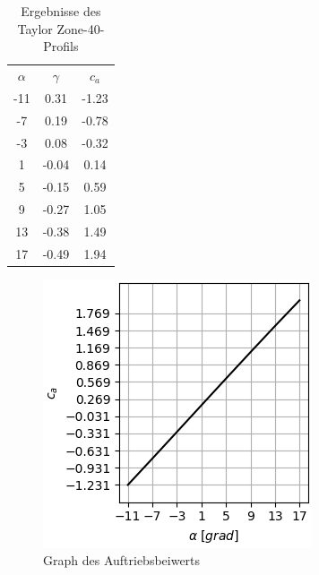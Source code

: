 \begin{minipage}{0.45\textwidth}
\begin{table}[H]
    \centering
    \begin{tabular}{c|cc}
    $\alpha$ & $\gamma$ & $c_a$ \\
        -11 & 0.31 & -1.23 \\ 
-7 & 0.19 & -0.78 \\ 
-3 & 0.08 & -0.32 \\ 
1 & -0.04 & 0.14 \\ 
5 & -0.15 & 0.59 \\ 
9 & -0.27 & 1.05 \\ 
13 & -0.38 & 1.49 \\ 
17 & -0.49 & 1.94 \\ 

    \end{tabular}
    \label{tab:zone}
    \caption{Ergebnisse des Taylor Zone-40-Profils}
\end{table}
\end{minipage}
\hfill
\begin{minipage}{0.45\textwidth}
\begin{figure}[H]
    \centering
    \includegraphics[scale=0.6]{figures/zoneca.png}
    \caption{Graph des Auftriebsbeiwerts}
    \label{fig:zoneca}
\end{figure}
\end{minipage}

